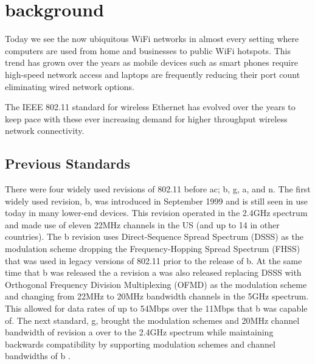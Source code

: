 \section{background}

Today we see the now ubiquitous WiFi networks in almost every setting where computers are used from home and businesses to public WiFi hotspots. This trend has grown over the years as mobile devices such as smart phones require high-speed network access and laptops are frequently reducing their port count eliminating wired network options.

The IEEE 802.11 standard for wireless Ethernet has evolved over the years to keep pace with these ever increasing demand for higher throughput wireless network connectivity.

\subsection{Previous Standards}

There were four widely used revisions of 802.11 before ac; b, g, a, and n. The first widely used revision, b, was introduced in September 1999 \cite{ieee802b} and is still seen in use today in many lower-end devices. This revision operated in the 2.4GHz spectrum and made use of eleven 22MHz channels in the US (and up to 14 in other countries). The b revision uses Direct-Sequence Spread Spectrum (DSSS) as the modulation scheme dropping the Frequency-Hopping Spread Spectrum (FHSS) that was used in legacy versions of 802.11 prior to the release of b. At the same time that b was released the a revision a \cite{ieee802a} was also released replacing DSSS with Orthogonal Frequency Division Multiplexing (OFMD) as the modulation scheme and changing from 22MHz to 20MHz bandwidth channels in the 5GHz spectrum. This allowed for data rates of up to 54Mbps over the 11Mbps that b was capable of. The next standard, g, brought the modulation schemes and 20MHz channel bandwidth of revision a over to the 2.4GHz spectrum while maintaining backwards compatibility by supporting modulation schemes and channel bandwidths of b \cite{ieee802g}.

